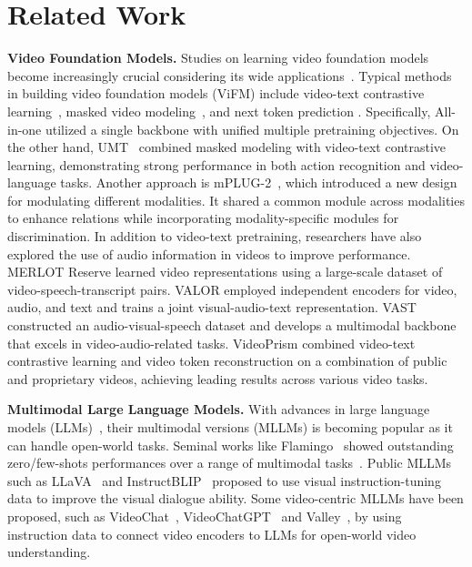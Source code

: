 \section{Related Work} \label{sec:relate}
\noindent \textbf{Video Foundation Models.}
Studies on learning video foundation models become increasingly crucial considering its wide applications~\cite{cpd,videoclip,umt,wang2022internvideo,videoprism,wang2023masked,videococa,st_mae,wang2023allinone,videomae,wang2023videomae}. Typical methods in building video foundation models (ViFM) include video-text contrastive learning~\cite{cpd,videoclip,wang2022internvideo}, masked video modeling~\cite{videomae,wang2023videomae,wang2022internvideo,violet}, and next token prediction \cite{flamingo,sun2023emu1,sun2023emu2}. Specifically, All-in-one \cite{wang2023allinone} utilized a single backbone with unified multiple pretraining objectives. On the other hand, UMT~\cite{umt} combined masked modeling with video-text contrastive learning, demonstrating strong performance in both action recognition and video-language tasks. Another approach is mPLUG-2~\cite{xu2023mplug}, which introduced a new design for modulating different modalities. It shared a common module across modalities to enhance relations while incorporating modality-specific modules for discrimination.
In addition to video-text pretraining, researchers have also explored the use of audio information in videos to improve performance. MERLOT Reserve \cite{zellers2022merlot} learned video representations using a large-scale dataset of video-speech-transcript pairs. VALOR \cite{chen2023valor} employed independent encoders for video, audio, and text and trains a joint visual-audio-text representation. VAST \cite{chen2024vast} constructed an audio-visual-speech dataset and develops a multimodal backbone that excels in video-audio-related tasks. VideoPrism \cite{videoprism} combined video-text contrastive learning and video token reconstruction on a combination of public and proprietary videos, achieving leading results across various video tasks.

\noindent \textbf{Multimodal Large Language Models.} With advances in large language models (LLMs)~\cite{devlin2018bert,t5,gpt3}, their multimodal versions (MLLMs) is becoming popular as it can handle open-world tasks. Seminal works like Flamingo~\cite{flamingo} showed outstanding zero/few-shots performances over a range of multimodal tasks~\cite{vqa,fickr,msrvtt,okvqa}. Public MLLMs~\cite{minigpt4,llava,mmgpt}
such as LLaVA~\cite{llava} and InstructBLIP~\cite{instructblip} proposed to use visual instruction-tuning data to improve the visual dialogue ability. Some video-centric MLLMs have been proposed, such as VideoChat~\cite{li2023videochat}, VideoChatGPT~\cite{videochatgpt} and Valley~\cite{valley}, by using instruction data to connect video encoders to LLMs for open-world video understanding. 